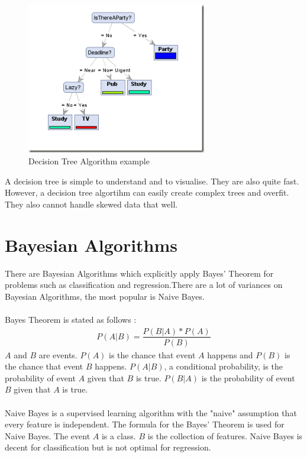 \begin{figure}[H]
\centering
\includegraphics[width=0.7\textwidth]{Figures/decisiontreeExample}
\decoRule
\caption[Decision Tree Algorithm example]{Decision Tree Algorithm example \cite{decisiontreeExample}}
\label{fig:decisiontreeExample}
\end{figure}

\noindent A decision tree is simple to understand and to visualise. They are also quite fast. However, a decision tree algortihm can easily create complex trees and overfit. They also cannot handle skewed data that well. \cite{decisiontree}

\section{Bayesian Algorithms}
There are Bayesian Algorithms which explicitly apply Bayes’ Theorem for problems such as classification and regression.There are a lot of variances on Bayesian Algorithms, the most popular is Naive Bayes. \cite{mlcat}\\\\
Bayes Theorem is stated as follows \cite{bayes}:
\begin{align}
P(A|B) = \dfrac{P(B|A) * P(A)}{P(B)}
\end{align}
$A$ and $B$ are events. $P(A)$ is the chance that event $A$ happens and $P(B)$ is the chance that event $B$ happens. $P(A | B)$, a conditional probability, is the probability of event $A$ given that $B$ is true.  $P(B | A)$ is the probability of event $B$ given that $A$ is true. \cite{bayes} \\\\
Naive Bayes is a supervised learning algorithm with the "naive" assumption that every feature is independent. The formula for the Bayes' Theorem is used for Naive Bayes. The event $A$ is a class. $B$ is the collection of features. Naive Bayes is decent for classification but is not optimal for regression. \cite{naivebayes}

